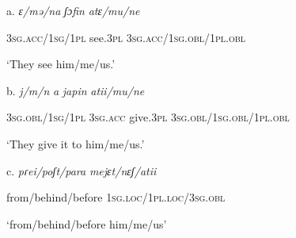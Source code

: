 \documentclass[output=paper]{langscibook}
\begin{document}
a.  \textit{ɛ/mə/na}      \textit{ʃɔfin}    \textit{atɛ/mu/ne}   

  \textsc{3sg.acc/1sg/1pl}    see.\textsc{3pl} \textsc{3sg.acc/1sg.obl/1pl.obl}

  ‘They see him/me/us.’

  b.  \textit{j/m/n}       \textit{a}   \textit{japin}    \textit{atii/mu/ne}

        \textsc{3sg.obl/1sg/1pl} \textsc{3sg.acc} give.\textsc{3pl}  \textsc{3sg.obl/1sg.obl/1pl.obl}

  ‘They give it to him/me/us.’

  c.  \textit{pɾei/poʃt/para}     \textit{mejɛt/nɛʃ/atii}

from/behind/before \textsc{1sg.loc/1pl.loc/3sg.obl}

  ‘from/behind/before him/me/us’
\end{document}
